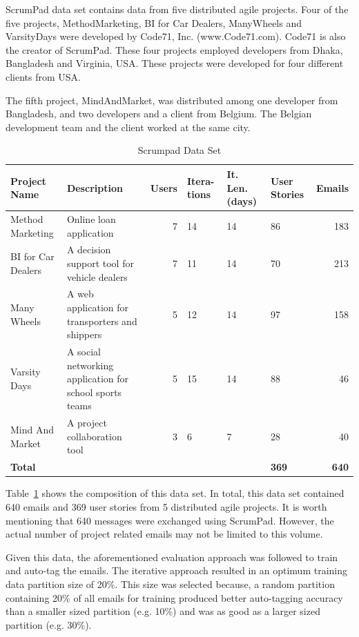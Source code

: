 ScrumPad data set contains data from five distributed agile projects. Four of the five projects, MethodMarketing, BI for Car Dealers, ManyWheels and VarsityDays were developed by Code71, Inc. (www.Code71.com). Code71 is also the creator of ScrumPad. These four projects employed developers from Dhaka, Bangladesh and Virginia, USA. These projects were developed for four different clients from USA.

The fifth project, MindAndMarket, was distributed among one developer from Bangladesh, and two developers and a client from Belgium. The Belgian development team and the client worked at the same city.

\begin{table}[h!]
  \centering
  \caption{Scrumpad Data Set}
	\label{tab:scrumpad_data_set}
    \begin{tabular}{|p{2cm}|p{4cm}|r|p{1cm}|p{1.2cm}|p{1.2cm}|r|}
      \hline
      \textbf{Project Name} & \textbf{Description} & \textbf{Users} & \textbf{Itera- tions} & \textbf{It. Len. (days)}  & \textbf{User Stories} & \textbf{Emails}\\
      \hline
      Method Marketing & Online loan application & 7 & 14 & 14 & 86 & 183 \\
      \hline
      BI for Car Dealers & A decision support tool for vehicle dealers & 7 & 11 & 14 & 70 & 213 \\
      \hline
      Many Wheels & A web application for transporters and shippers & 5 & 12 & 14 & 97 & 158 \\
      \hline
      Varsity Days & A social networking application for school sports teams & 5 & 15 & 14 & 88 & 46 \\
      \hline
      Mind And Market & A project collaboration tool & 3 & 6 & 7 & 28 & 40 \\
      \hline
      \textbf{Total} &  &  &  &  & \textbf{369} & \textbf{640}\\
      \hline
    \end{tabular}
\end{table}

Table~\ref{tab:scrumpad_data_set} shows the composition of this data set. In total, this data set contained 640 emails and 369 user stories from 5 distributed agile projects. It is worth mentioning that 640 messages were exchanged using ScrumPad. However, the actual number of project related emails may not be limited to this volume.

Given this data, the aforementioned evaluation approach was followed to train and auto-tag the emails. The iterative approach resulted in an optimum  training data partition size of 20\%. This size was selected because, a random partition containing 20\% of all emails for training produced better auto-tagging accuracy than a smaller sized partition (e.g. 10\%) and was as good as a larger sized partition (e.g. 30\%). 

